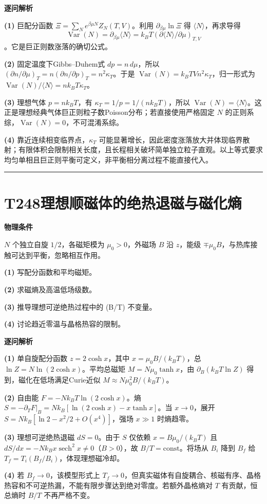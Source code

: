 \documentclass[UTF8,a4paper,11pt,oneside,openany]{ctexbook}
\begin{document}
\par\medskip\noindent\textbf{逐问解析}
\par\noindent\textbf{(1)} 巨配分函数 \(\Xi=\sum_N e^{\beta\mu N}Z_N(T,V)\)。利用 \(\partial_{\beta\mu}\ln\Xi\) 得 \(\langle N\rangle\)，再求导得 \[\operatorname{Var}(N)=\partial_{\beta\mu}\langle N\rangle=k_BT(\partial\langle N\rangle/\partial\mu)_{T,V}\]。它是巨正则数涨落的确切公式。
\par\noindent\textbf{(2)} 固定温度下Gibbs–Duhem式 \(dp=n\,d\mu\)，所以 \((\partial n/\partial\mu)_T=n(\partial n/\partial p)_T=n^2\kappa_T\)。于是 \(\operatorname{Var}(N)=k_BTVn^2\kappa_T\)，归一形式为 \(\operatorname{Var}(N)/\langle N\rangle=nk_BT\kappa_T\)。
\par\noindent\textbf{(3)} 理想气体 \(p=nk_BT\)，有 \(\kappa_T=1/p=1/(nk_BT)\)，所以 \(\operatorname{Var}(N)=\langle N\rangle\)。这正是理想经典气体巨正则粒子数Poisson分布；若直接使用严格固定 \(N\) 的正则系综，\(\operatorname{Var}(N)=0\)，不可混淆系综。
\par\noindent\textbf{(4)} 靠近连续相变临界点，\(\kappa_T\) 可能显著增长，因此密度涨落放大并体现临界散射；有限体积会限制相关长度，且长程相关破坏简单独立粒子直观。以上等式要求均匀单相且巨正则平衡可定义，非平衡相分离过程不能直接代入。

\par\bigskip\hrule\bigskip
\section*{T248\quad 理想顺磁体的绝热退磁与磁化熵}
\textbf{物理条件}\par \(N\) 个独立自旋 \(1/2\)，各磁矩模为 \(\mu_0>0\)，外磁场 \(B\) 沿 \(z\)，能级 \(\mp\mu_0 B\)，与热库接触可达到平衡，忽略相互作用。
\par\noindent\textbf{(1)} 写配分函数和平均磁矩。
\par\noindent\textbf{(2)} 求磁熵及高温低场级数。
\par\noindent\textbf{(3)} 推导理想可逆绝热过程中的 (B/T) 不变量。
\par\noindent\textbf{(4)} 讨论趋近零温与晶格热容的限制。

\par\medskip\noindent\textbf{逐问解析}
\par\noindent\textbf{(1)} 单自旋配分函数 \(z=2\cosh x\)，其中 \(x=\mu_0B/(k_BT)\)，总 \(\ln Z=N\ln(2\cosh x)\)。平均总磁矩 \(M=N\mu_0\tanh x\)，由 \(\partial_B(k_BT\ln Z)\) 得到，磁化在低场满足Curie近似 \(M\approx N\mu_0^2B/(k_BT)\)。
\par\noindent\textbf{(2)} 自由能 \(F=-Nk_BT\ln(2\cosh x)\)。熵 \(S=-\partial_TF|_B=Nk_B[\ln(2\cosh x)-x\tanh x]\)。当 \(x\to0\)，展开 \(S=Nk_B[\ln2-x^2/2+O(x^4)]\)，强场 \(x\gg1\) 时熵趋零。
\par\noindent\textbf{(3)} 理想可逆绝热退磁 \(dS=0\)。由于 \(S\) 仅依赖 \(x=B\mu_0/(k_BT)\) 且 \(dS/dx=-Nk_Bx\operatorname{sech}^2x\neq0\)（\(B>0\)），故 \(B/T=\mathrm{const}\)。将场从 \(B_i\) 降到 \(B_f\) 给 \(T_f=T_i(B_f/B_i)\)，体现理想磁冷却。
\par\noindent\textbf{(4)} 若 \(B_f\to0\)，该模型形式上 \(T_f\to0\)，但真实磁体有自旋耦合、核磁有序、晶格热容和不可逆热漏，不能有限步骤达到绝对零度。若额外晶格熵对 \(T\) 有贡献，恒总熵时 \(B/T\) 不再严格不变。
\end{document}
